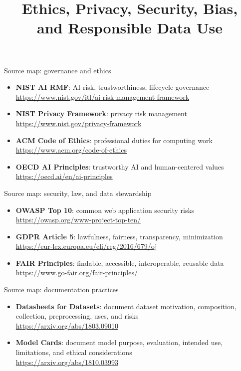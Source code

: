 \documentclass[aspectratio=43,12pt]{beamer}
\title{Ethics, Privacy, Security, Bias,\\and Responsible Data Use}
\author{}
\date{
\color{aggiemaroon}{
DAEN 459 - Fall 2026\\
\textbf{Alexander Abuabara}
}}
\begin{document}
\frame{\titlepage}

\begin{frame}{Source map: governance and ethics}
\begin{itemize}
  \item \textbf{NIST AI RMF}: AI risk, trustworthiness, lifecycle governance\\
  \url{https://www.nist.gov/itl/ai-risk-management-framework}
  \item \textbf{NIST Privacy Framework}: privacy risk management\\
  \url{https://www.nist.gov/privacy-framework}
  \item \textbf{ACM Code of Ethics}: professional duties for computing work\\
  \url{https://www.acm.org/code-of-ethics}
  \item \textbf{OECD AI Principles}: trustworthy AI and human-centered values\\
  \url{https://oecd.ai/en/ai-principles}
\end{itemize}
\end{frame}

\begin{frame}{Source map: security, law, and data stewardship}
\begin{itemize}
  \item \textbf{OWASP Top 10}: common web application security risks\\
  \url{https://owasp.org/www-project-top-ten/}
  \item \textbf{GDPR Article 5}: lawfulness, fairness, transparency, minimization\\
  \url{https://eur-lex.europa.eu/eli/reg/2016/679/oj}
  \item \textbf{FAIR Principles}: findable, accessible, interoperable, reusable data\\
  \url{https://www.go-fair.org/fair-principles/}
\end{itemize}
\end{frame}

\begin{frame}{Source map: documentation practices}
\begin{itemize}
  \item \textbf{Datasheets for Datasets}: document dataset motivation, composition, collection, preprocessing, uses, and risks\\
  \url{https://arxiv.org/abs/1803.09010}
  \item \textbf{Model Cards}: document model purpose, evaluation, intended use, limitations, and ethical considerations\\
  \url{https://arxiv.org/abs/1810.03993}
\end{itemize}
\end{frame}
\end{document}
